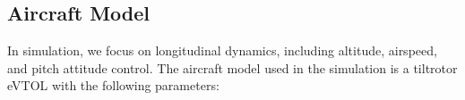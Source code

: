 \documentclass[journal,article,submit,pdftex,moreauthors]{Definitions/mdpi}
\begin{document}
\subsection{Aircraft Model}
In simulation, we focus on longitudinal dynamics, including altitude, airspeed, and pitch attitude control. The aircraft model used in the simulation is a tiltrotor eVTOL with the following parameters:
    
    
\end{document}
